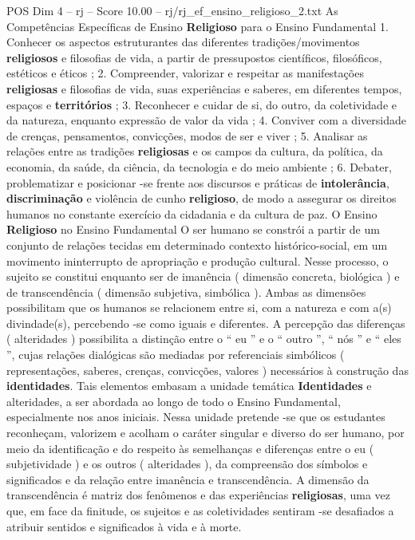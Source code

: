\begin{textsample}{POS Dim 4 – rj – Score 10.00 – rj/rj\_ef\_ensino\_religioso\_2.txt}  \label{ex:f4_pos_163}
As Competências Específicas de Ensino \textbf{Religioso} para o Ensino Fundamental 1.
Conhecer os aspectos estruturantes das diferentes tradições/movimentos \textbf{religiosos} e filosofias de vida, a partir de pressupostos científicos, filosóficos, estéticos e éticos ; 2.
Compreender, valorizar e respeitar as manifestações \textbf{religiosas} e filosofias de vida, suas experiências e saberes, em diferentes tempos, espaços e \textbf{territórios} ; 3.
Reconhecer e cuidar de si, do outro, da coletividade e da natureza, enquanto expressão de valor da vida ; 4.
Conviver com a diversidade de crenças, pensamentos, convicções, modos de ser e viver ; 5.
Analisar as relações entre as tradições \textbf{religiosas} e os campos da cultura, da política, da economia, da saúde, da ciência, da tecnologia e do meio ambiente ; 6.
Debater, problematizar e posicionar -se frente aos discursos e práticas de \textbf{intolerância}, \textbf{discriminação} e violência de cunho \textbf{religioso}, de modo a assegurar os direitos humanos no constante exercício da cidadania e da cultura de paz.
O Ensino \textbf{Religioso} no Ensino Fundamental O ser humano se constrói a partir de um conjunto de relações tecidas em determinado contexto histórico-social, em um movimento ininterrupto de apropriação e produção cultural.
Nesse processo, o sujeito se constitui enquanto ser de imanência ( dimensão concreta, biológica ) e de transcendência ( dimensão subjetiva, simbólica ).
Ambas as dimensões possibilitam que os humanos se relacionem entre si, com a natureza e com a(s) divindade(s), percebendo -se como iguais e diferentes.
A percepção das diferenças ( alteridades ) possibilita a distinção entre o “ eu ” e o “ outro ”, “ nós ” e “ eles ”, cujas relações dialógicas são mediadas por referenciais simbólicos ( representações, saberes, crenças, convicções, valores ) necessários à construção das \textbf{identidades}.
Tais elementos embasam a unidade temática \textbf{Identidades} e alteridades, a ser abordada ao longo de todo o Ensino Fundamental, especialmente nos anos iniciais.
Nessa unidade pretende -se que os estudantes reconheçam, valorizem e acolham o caráter singular e diverso do ser humano, por meio da identificação e do respeito às semelhanças e diferenças entre o eu ( subjetividade ) e os outros ( alteridades ), da compreensão dos símbolos e significados e da relação entre imanência e transcendência.
A dimensão da transcendência é matriz dos fenômenos e das experiências \textbf{religiosas}, uma vez que, em face da finitude, os sujeitos e as coletividades sentiram -se desafiados a atribuir sentidos e significados à vida e à morte.

\end{textsample}
